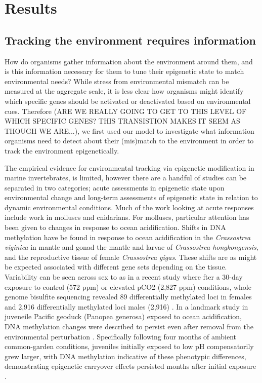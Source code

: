 \documentclass{article}
\begin{document}
\clearpage

\section{Results}

\subsection{Tracking the environment requires information}
How do organisms gather information about the environment around them, and is this information necessary for them to tune their epigenetic state to match environmental needs? While stress from environmental mismatch can be measured at the aggregate scale, it is less clear how organisms might identify which specific genes should be activated or deactivated based on environmental cues. Therefore (ARE WE REALLY GOING TO GET TO THIS LEVEL OF WHICH SPECIFIC GENES? THIS TRANSISTION MAKES IT SEEM AS THOUGH WE ARE...), we first used our model to investigate what information organisms need to detect about their (mis)match to the environment in order to track the environment epigenetically.


The empirical evidence for environmental tracking via epigenetic modification in marine invertebrates, is limited, however there are a handful of studies can be separated in two categories; acute assessments in epigenetic state upon environmental change and long-term assessments of epigenetic state in relation to dynamic environmental conditions. Much of the work looking at acute responses include work in molluscs and cnidarians. For molluscs, particular attention has been given to changes in response to ocean acidification. Shifts in DNA methylation  have be found in response to ocean acidification in the \textit{Crassostrea viginica} in mantle \cite{10.3389/fmars.2020.566419} and gonad \cite{0.3389/fmars.2020.00225} the mantle \cite{10.1111/gcb.15675} and larvae \cite{10.1016/j.marenvres.2020.105217, 10.1111/mec.16751} of \textit{Crassostrea hongkongensis}, and the reproductive tissue \cite{10.1186/s12864-022-08781-5} of female \textit{Crassostrea gigas}. These shifts are as might be expected associated with different gene sets depending on the tissue. Variability can be seen across sex to as in a recent study where fter a 30-day exposure to control (572 ppm) or elevated pCO2 (2,827 ppm) conditions, whole genome bisulfite sequencing revealed 89 differentially methylated loci in females and 2,916 differentially methylated loci males (2,916) \cite{10.1101/2024.04.04.588108}. In a landmark study in juveneile Pacific geoduck (Panopea generosa) exposed to ocean acidification, DNA methylation changes were described to persist even after removal from the environmental perturbation \cite{10.1101/2022.06.24.497506}. Specifically following four months of ambient common-garden conditions, juveniles initially exposed to low pH compensatorily grew larger, with DNA methylation indicative of these phenotypic differences, demonstrating epigenetic carryover effects persisted months after initial exposure \cite{10.1101/2022.06.24.497506}. 
\end{document}
